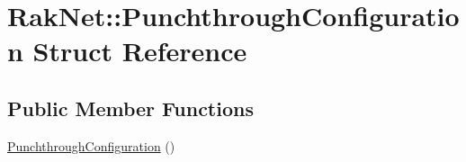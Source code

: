 \hypertarget{struct_rak_net_1_1_punchthrough_configuration}{\section{Rak\-Net\-:\-:Punchthrough\-Configuration Struct Reference}
\label{struct_rak_net_1_1_punchthrough_configuration}
}
\subsection*{Public Member Functions}
\begin{DoxyCompactItemize}
\item 
\hyperlink{struct_rak_net_1_1_punchthrough_configuration_ab9e1fa85acd4c1cb5d5eacf414ade79f}{Punchthrough\-Configuration} ()
\end{DoxyCompactItemize}
